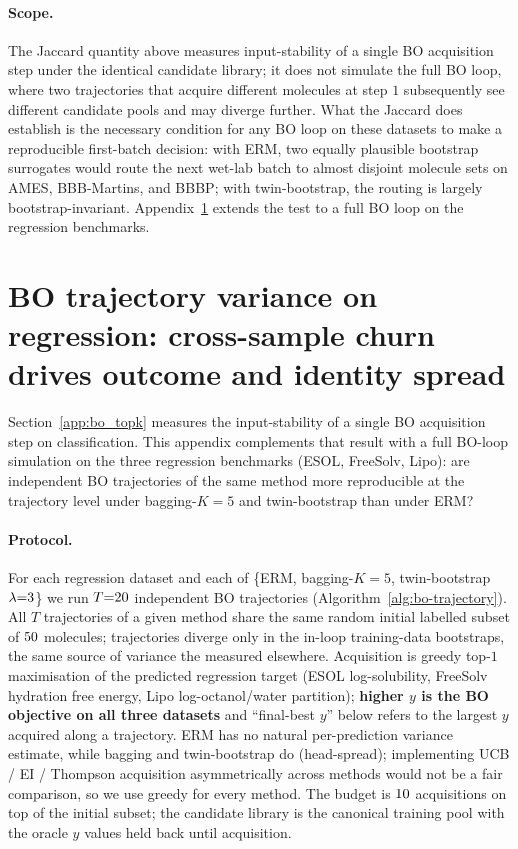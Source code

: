 \paragraph{Scope.}
The Jaccard quantity above measures input-stability of a single BO
acquisition step under the identical candidate library; it does not
simulate the full BO loop, where two trajectories that acquire
different molecules at step $1$ subsequently see different candidate
pools and may diverge further.  What the Jaccard does establish is
the necessary condition for any BO loop on these datasets to make a
reproducible first-batch decision: with ERM, two equally plausible
bootstrap surrogates would route the next wet-lab batch to almost
disjoint molecule sets on AMES, BBB-Martins, and BBBP; with
twin-bootstrap, the routing is largely bootstrap-invariant.
Appendix~\ref{app:bo_loop_reg} extends the test to a full BO loop on
the regression benchmarks.

\section{\boldmath BO trajectory variance on regression: cross-sample churn drives outcome and identity spread}
\label{app:bo_loop_reg}

Section~\ref{app:bo_topk} measures the input-stability of a single
BO acquisition step on classification.  This appendix complements
that result with a full BO-loop simulation on the three regression
benchmarks (ESOL, FreeSolv, Lipo): are independent BO trajectories
of the same method more reproducible at the trajectory level under
bagging-$K{=}5$ and twin-bootstrap than under ERM?

\paragraph{Protocol.}
For each regression dataset and each of \{ERM, bagging-$K{=}5$,
twin-bootstrap $\lambda{=}3$\} we run
$T{=}20$ independent BO trajectories
(Algorithm~\ref{alg:bo-trajectory}).  All $T$ trajectories of a
given method share the same random initial labelled subset of
$50$ molecules; trajectories diverge only in the
in-loop training-data bootstraps, the same source of variance the
measured elsewhere.  Acquisition is greedy top-$1$ maximisation of
the predicted regression target (ESOL log-solubility,
FreeSolv hydration free energy, Lipo log-octanol/water partition);
\textbf{higher $y$ is the BO objective on all three datasets} and
``final-best $y$'' below refers to the largest $y$ acquired along
a trajectory.  ERM has no natural per-prediction variance estimate,
while bagging and twin-bootstrap do (head-spread); implementing
UCB / EI / Thompson acquisition asymmetrically across methods would
not be a fair comparison, so we use greedy for every method.  The
budget is $10$ acquisitions on top of the initial
subset; the candidate library is the canonical training pool with
the oracle $y$ values held back until acquisition.

